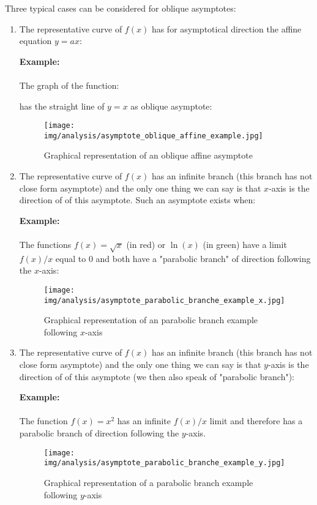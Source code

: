 \begin{enumerate}
		Three typical cases can be considered for oblique asymptotes:
		\begin{enumerate}
			\item The representative curve of $f(x)$ has for asymptotical direction the affine equation $y=ax$:
			
			\begin{tcolorbox}[colframe=black,colback=white,sharp corners]
			\textbf{{\Large {}}Example:}\\\\
			The graph of the function:
			
			 has the straight line of $y=x$ as oblique asymptote:
			 \begin{figure}[H]
				\centering
				\texttt{[image: img/analysis/asymptote\_oblique\_affine\_example.jpg]}
				\caption{Graphical representation of an oblique affine asymptote}
			\end{figure}
			\end{tcolorbox}
			
			\item The representative curve of $f(x)$ has an infinite branch (this branch has not close form asymptote) and the only one thing we can say is that $x$-axis is the direction of of this asymptote. Such an asymptote exists when:
			
			\begin{tcolorbox}[colframe=black,colback=white,sharp corners]
			\textbf{{\Large {}}Example:}\\\\
			The functions $f(x)=\sqrt{x}$ (in red) or $\ln(x)$ (in green) have a limit $f(x)/x$ equal to $0$ and both have a "parabolic branch"  of direction following the $x$-axis:
			 \begin{figure}[H]
				\centering
				\texttt{[image: img/analysis/asymptote\_parabolic\_branche\_example\_x.jpg]}
				\caption[]{Graphical representation of an parabolic branch example following $x$-axis}
			\end{figure}
			\end{tcolorbox}
			
			\item The representative curve of $f(x)$ has an infinite branch (this branch has not close form asymptote) and the only one thing we can say is that $y$-axis is the direction of of this asymptote (we then also speak of "parabolic branch"):
			
			\begin{tcolorbox}[colframe=black,colback=white,sharp corners]
			\textbf{{\Large {}}Example:}\\\\
			The function $f(x)=x^2$ has an infinite $f(x)/x$ limit and therefore has a parabolic branch of direction following the $y$-axis.
			 \begin{figure}[H]
				\centering
				\texttt{[image: img/analysis/asymptote\_parabolic\_branche\_example\_y.jpg]}
				\caption[]{Graphical representation of a parabolic branch example following $y$-axis}
			\end{figure}
			\end{tcolorbox}
			

\end{enumerate}
\end{enumerate}

